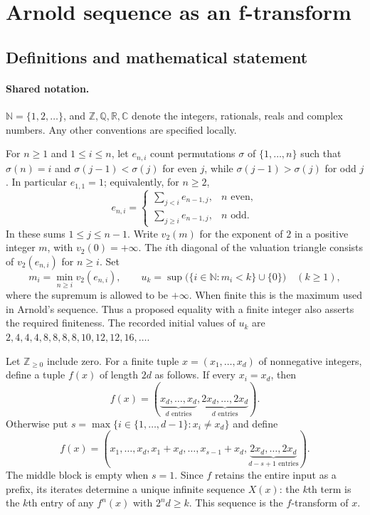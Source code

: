 \documentclass[11pt]{article}
\begin{document}
\section{Arnold sequence as an f-transform}\label{statement}

\subsection{Definitions and mathematical statement}

\paragraph{Shared notation.}$\mathbb N=\{1,2,\ldots\}$, and $\mathbb Z,\mathbb Q,\mathbb R,\mathbb C$ denote the integers, rationals, reals and complex numbers. Any other conventions are specified locally.


For $n\ge1$ and $1\le i\le n$, let $e_{n,i}$ count permutations $\sigma$ of $\{1,\ldots,n\}$ such that $\sigma(n)=i$ and $\sigma(j-1)<\sigma(j)$ for even $j$, while $\sigma(j-1)>\sigma(j)$ for odd $j$. In particular $e_{1,1}=1$; equivalently, for $n\ge2$,
\[
e_{n,i}=\begin{cases}\sum_{j<i}e_{n-1,j},&n\text{ even},\\\sum_{j\ge i}e_{n-1,j},&n\text{ odd}.\end{cases}
\]
In these sums $1\le j\le n-1$. Write $v_2(m)$ for the exponent of $2$ in a positive integer $m$, with $v_2(0)=+\infty$. The $i$th diagonal of the valuation triangle consists of $v_2(e_{n,i})$ for $n\ge i$. Set
\[
m_i=\min_{n\ge i}v_2(e_{n,i}),\qquad
u_k=\sup\bigl(\{i\in\mathbb N:m_i<k\}\cup\{0\}\bigr)\quad(k\ge1),
\]
where the supremum is allowed to be $+\infty$. When finite this is the maximum used in Arnold's sequence. Thus a proposed equality with a finite integer also asserts the required finiteness. The recorded initial values of $u_k$ are $2,4,4,4,8,8,8,8,10,12,12,16,\ldots$.

Let $\mathbb Z_{\ge0}$ include zero. For a finite tuple $x=(x_1,\ldots,x_d)$ of nonnegative integers, define a tuple $f(x)$ of length $2d$ as follows. If every $x_i=x_d$, then
\[
f(x)=(\underbrace{x_d,\ldots,x_d}_{d\text{ entries}},\underbrace{2x_d,\ldots,2x_d}_{d\text{ entries}}).
\]
Otherwise put $s=\max\{i\in\{1,\ldots,d-1\}:x_i\ne x_d\}$ and define
\[
f(x)=(x_1,\ldots,x_d,x_1+x_d,\ldots,x_{s-1}+x_d,\underbrace{2x_d,\ldots,2x_d}_{d-s+1\text{ entries}}).
\]
The middle block is empty when $s=1$. Since $f$ retains the entire input as a prefix, its iterates determine a unique infinite sequence $X(x)$: the $k$th term is the $k$th entry of any $f^n(x)$ with $2^nd\ge k$. This sequence is the $f$-transform of $x$.
\end{document}
